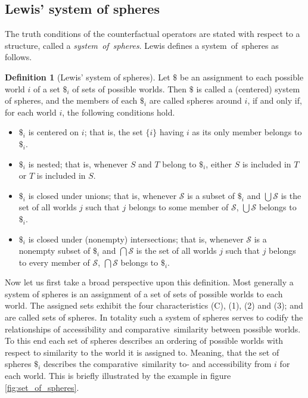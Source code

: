 \documentclass[a4paper,american,10pt]{paper}
\theoremstyle{definition}\newtheorem{definition}{Definition}
\begin{document}
\subsection{Lewis' system of spheres}
The truth conditions of the counterfactual operators are stated with respect to a structure, called a \textit{system~of~spheres}. Lewis defines a system~of~spheres as follows.
\begin{definition}[Lewis' system of spheres]
Let $\$$ be an assignment to each possible world $i$ of a set $\$_i$ of sets of possible worlds. Then $\$$ is called a (centered) system of spheres, and the members of each $\$_i$ are called spheres around $i$, if and only if, for each world $i$, the following conditions hold.
	\begin{itemize}
	\item[(C)] $\$_i$ is centered on $i$; that is, the set $\{i\}$ having $i$ as its only member belongs to $\$_i$.
	\item[(1)] $\$_i$ is nested; that is, whenever $S$ and $T$ belong to $\$_i$, either $S$ is included in $T$ or $T$ is included in $S$.
	\item[(2)] $\$_i$ is closed under unions; that is, whenever $\mathscr{S}$ is a subset of $\$_i$ and $\bigcup\mathscr{S}$ is the set of all worlds $j$ such that $j$ belongs to some member of $\mathscr{S}$, $\bigcup\mathscr{S}$ belongs to $\$_i$.
	\item[(3)] $\$_i$ is closed under (nonempty) intersections; that is, whenever $\mathscr{S}$ is a nonempty subset of $\$_i$ and $\bigcap\mathscr{S}$ is the set of all worlds $j$ such that $j$ belongs to every member of $\mathscr{S}$, $\bigcap\mathscr{S}$ belongs to $\$_i$.
	\end{itemize}
	\label{def:system_of_spheres}
\end{definition}
\noindent Now let us first take a broad perspective upon this definition. Most generally a system of spheres is an assignment of a set of sets of possible worlds to each world. The assigned sets exhibit the four characteristics (C), (1), (2) and (3); and are called sets of spheres. In totality such a system of spheres serves to codify the relationships of accessibility and comparative~similarity between possible worlds. To this end each set of spheres describes an ordering of possible worlds with respect to similarity to the world it is assigned to. Meaning, that the set of spheres $\$_i$ describes the comparative~similarity to- and accessibility from $i$ for each world. This is briefly illustrated by the example in figure \ref{fig:set_of_spheres}.
\end{document}
